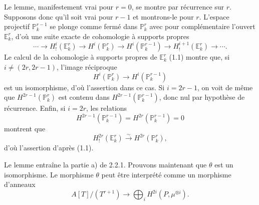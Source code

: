 \documentclass[11pt]{article}
\begin{document}
Le lemme, manifestement vrai pour $r=0$, se montre par récurrence sur $r$. Supposons donc qu'il soit vrai pour $r-1$ et montrons-le pour $r$. L'espace projectif $\mathbb P_k^{r-1}$ se plonge comme fermé dans $\mathbb P_k^r$ avec pour complémentaire l'ouvert $\mathbb E_k^r$, d'où une suite exacte de cohomologie à supports propres
\[
\cdots\longrightarrow H_!^i(\mathbb E_k^r)\longrightarrow H^i(\mathbb P_k^r)
\longrightarrow H^i(\mathbb P_k^{r-1})\longrightarrow H_!^{i+1}(\mathbb E_k^r)\longrightarrow\cdots.
\]
Le calcul de la cohomologie à supports propres de $\mathbb E_k^r$ (1.1) montre que, si $i\ne(2r,2r-1)$, l'image réciproque
\[
H^i(\mathbb P_k^r)\longrightarrow H^i(\mathbb P_k^{r-1})
\]
est un isomorphisme, d'où l'assertion dans ce cas. Si $i=2r-1$, on voit de même que $H^{2r-1}(\mathbb P_k^r)$ est contenu dans $H^{2r-1}(\mathbb P_k^{r-1})$, donc nul par hypothèse de récurrence. Enfin, si $i=2r$, les relations
\[
H^{2r-1}(\mathbb P_k^{r-1})=H^{2r}(\mathbb P_k^{r-1})=0
\]
montrent que
\[
H_!^{2r}(\mathbb E_k^r)\xrightarrow{\sim}H^{2r}(\mathbb P_k^r),
\]
d'où l'assertion d'après (1.1).

Le lemme entraîne la partie a) de 2.2.1. Prouvons maintenant que $\theta$ est un isomorphisme. Le morphisme $\theta$ peut être interprété comme un morphisme d'anneaux
\[
A[T]/(T^{r+1})\longrightarrow\bigoplus_i H^{2i}(P,\mu^{\otimes i}).
\]
\end{document}
